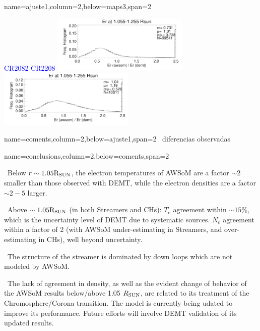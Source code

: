 \documentclass[paperwidth=100cm,paperheight=120cm]{baposter}
\def\bu{\textcolor{red}{\textbullet~}}
\def\bu{\textcolor{red}{\textbullet~}}
\def\azul#1{\textcolor{blue}{#1}}
\begin{document}
\begin{poster}
{{}
}

{name=ajuste1,column=2,below=maps3,span=2}{
{\footnotesize\sf
\begin{center}
\azul{\hskip 3.5cm CR2082 \hfill CR2208 \hskip 3.0cm}
{\includegraphics[width=0.49\textwidth]{comparison_Er_awsom_vs_demt_H_cr2082_ratio_streamer_ratio_range1055-1250_Rsun.pdf}}
{\includegraphics[width=0.49\textwidth]{comparison_Er_awsom_vs_demt_H_cr2208_ratio_streamer_ratio_range1055-1250_Rsun.pdf}}\\
\end{center}
}
}
{name=coments,column=2,below=ajuste1,span=2}{
{\footnotesize\sf
\bu diferencias observadas
}
}

{name=conclusions,column=2,below=coments,span=2}{
{\footnotesize\sf
\bu Below $r \sim 1.05 {\rm R_{SUN}}$, the electron temperatures of AWSoM are a factor $\sim 2$ smaller than those observed with DEMT, while the electron densities are a factor $\sim 2-5$ larger.

\bu Above $\sim 1.05 {\rm R_{SUN}}$ (in both Streamers and CHs): $T_e$ agreement within $\sim 15 \%$, which is the uncertainty level of DEMT due to systematic sources. $N_e$ agreement within a factor of 2 (with AWSoM under-estimating in Streamers, and over-estimating in CHs), well beyond uncertainty.

\bu The structure of the streamer is dominated by down loops which are not modeled by AWSoM.

\bu The lack of agreement in density, as well as the evident change of behavior of the AWSoM results below/above 1.05 $R_{\rm SUN}$, are related to its treatment of the Chromosphere/Corona transition. The model is currently being udated to improve its performance. Future efforts will involve DEMT validation of its updated results.

}
}

\end{poster}%
\end{document}
